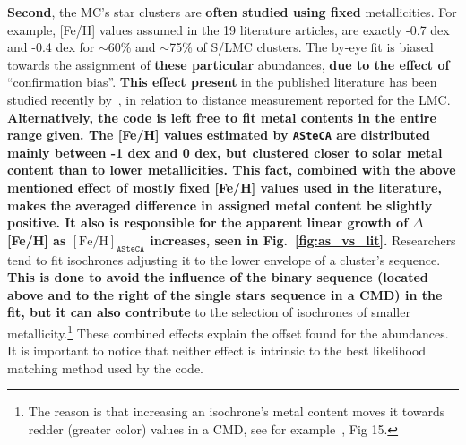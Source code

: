 \documentclass[referee]{aa}
\begin{document}
\noindent \textbf{Second}, the MC's star clusters are \textbf{often studied
using fixed} metallicities. For example, [Fe/H] values assumed in the 19
literature articles, are exactly -0.7 dex and -0.4 dex for $\sim$60\% and
$\sim$75\% of S/LMC clusters. The by-eye fit is biased towards the
assignment of \textbf{these particular} abundances, \textbf{due to the effect
of} ``confirmation bias''. \textbf{This effect present} in the published
literature has been studied recently by~\cite{de_Grijs_2014}, in relation to
distance measurement reported for the LMC.\@
\textbf{Alternatively, the code is left free to fit metal contents in the
entire range given. The [Fe/H] values estimated by \texttt{ASteCA} are
distributed mainly between -1 dex and 0 dex, but clustered closer to solar
metal content than to lower metallicities. This fact, combined with the above
mentioned effect of mostly fixed [Fe/H] values used in the literature, makes the
averaged difference in assigned metal content be slightly positive.
It also is responsible for the apparent linear growth of $\Delta$[Fe/H] as
$\mathrm{[Fe/H]}_{\mathtt{ASteCA}}$ increases, seen in Fig.~\ref{fig:as_vs_lit}.}
%
Researchers tend to fit isochrones adjusting it to the lower envelope of a
cluster's sequence. \textbf{This is done to avoid the influence of the binary
sequence (located above and to the right of the single stars sequence in a CMD)
in the fit, but it can also contribute} to the selection of
isochrones of smaller metallicity.\footnote{The reason is that increasing an
isochrone's metal content moves it towards redder (greater color) values in a
CMD, see for example~\cite{Bressan_2012}, Fig 15.}
%
These combined effects explain the offset found for the abundances. It is
important to notice that neither effect is intrinsic to the best likelihood
matching method used by the code.
\end{document}
